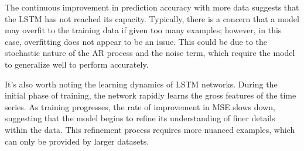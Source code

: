 The continuous improvement in prediction accuracy with more data suggests that the LSTM has not reached its capacity. Typically, there is a concern that a model may overfit to the training data if given too many examples; however, in this case, overfitting does not appear to be an issue. This could be due to the stochastic nature of the AR process and the noise term, which require the model to generalize well to perform accurately.

It's also worth noting the learning dynamics of LSTM networks. During the initial phase of training, the network rapidly learns the gross features of the time series. As training progresses, the rate of improvement in MSE slows down, suggesting that the model begins to refine its understanding of finer details within the data. This refinement process requires more nuanced examples, which can only be provided by larger datasets.